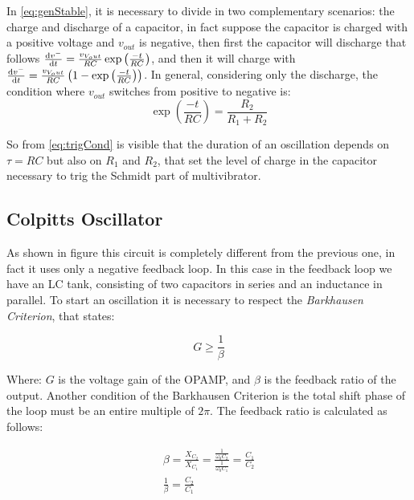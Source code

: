 \documentclass[a4paper, twocolumn]{article}
\begin{document}
In \eqref{eq:genStable}, it is necessary to divide in two complementary scenarios: the charge and discharge of a capacitor, in fact suppose the capacitor is charged with a positive voltage and \(v_{out}\) is negative, then first the capacitor will discharge that follows \(\dv{v^-}{t}= \frac{v_{V_out}}{RC}\exp\left(\frac{-t}{RC}\right)\), and then it will charge with \(\dv{v^-}{t}= \frac{v_{V_out}}{RC}\left(1-\exp\left(\frac{-t}{RC}\right)\right)\). In general, considering only the discharge, the condition where \(v_{out}\) switches from positive to negative is:
\begin{equation}
    \label{eq:trigCond}
    \exp\left(\frac{-t}{RC}\right) = \frac{R_2}{R_1+R_2}
\end{equation}

So from \eqref{eq:trigCond} is visible that the duration of an oscillation depends on \(\tau = RC\) but also on \(R_1\) and \(R_2\), that set the level of charge in the capacitor necessary to trig the Schmidt part of multivibrator.

\subsection{Colpitts Oscillator}

\begin{center}
    \centering
    \def \svgwidth{\columnwidth}
    
\end{center}

As shown in figure this circuit is completely different from the previous one, in fact it uses only a negative feedback loop. In this case in the feedback loop we have an LC tank, consisting of two capacitors in series and an inductance in parallel. To start an oscillation it is necessary to respect the \emph{Barkhausen Criterion}, that states:

\begin{equation}
    G \ge \frac{1}{\beta}
\end{equation}

Where: \(G\) is the voltage gain of the OPAMP, and $\beta$ is the feedback ratio of the output. Another condition of the Barkhausen Criterion is the total shift phase of the loop must be an entire multiple of \(2\pi\). 
The feedback ratio is calculated as follows: 

\begin{gather}
        \beta  = \frac{X_{C_2}}{X_{C_1}} = \frac{\frac{1}{\omega_0 C_2}}{\frac{1}{\omega_0 C_1}} = \frac{C_1}{C_2}\\
    \frac{1}{\beta}= \frac{C_2}{C_1}
\end{gather}
\end{document}
